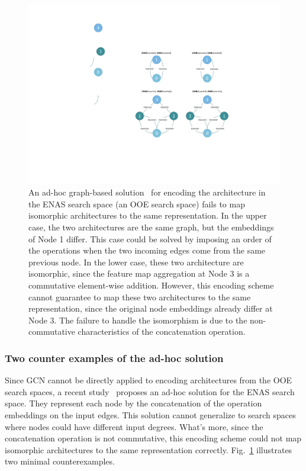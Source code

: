 \begin{figure}[tb]
\begin{center}
\includegraphics[width=0.64\linewidth]{figs/counter_new.pdf}
\caption{An ad-hoc graph-based solution~\cite{guo2019nat} for encoding the architecture in the ENAS search space (an OOE search space) fails to map isomorphic architectures to the same representation. In the upper case, the two architectures are the same graph, but the embeddings of Node 1 differ. This case could be solved by imposing an order of the operations when the two incoming edges come from the same previous node. In the lower case, these two architecture are isomorphic, since the feature map aggregation at Node 3 is a commutative element-wise addition. However, this encoding scheme cannot guarantee to map these two architectures to the same representation, since the original node embeddings already differ at Node 3. The failure to handle the isomorphism is due to the non-commutative characteristics of the concatenation operation.}
\label{fig:guo_gcn_counter_example}
\end{center}
\end{figure}

\subsubsection{Two counter examples of the ad-hoc solution~\cite{guo2019nat}}
Since GCN cannot be directly applied to encoding architectures from the OOE search spaces, a recent study~\cite{guo2019nat} proposes an ad-hoc solution for the ENAS search space. They represent each node by the concatenation of the operation embeddings on the input edges. This solution cannot generalize to search spaces where nodes could have different input degrees. What’s more, since the concatenation operation is not commutative, this encoding scheme could not map isomorphic architectures to the same representation correctly. Fig.~\ref{fig:guo_gcn_counter_example} illustrates two minimal counterexamples.

